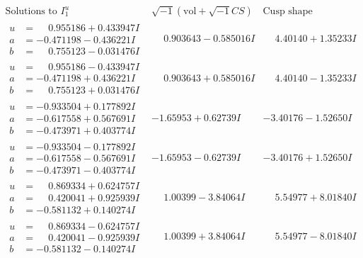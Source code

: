 \documentclass[1p]{elsarticle_modified}
\theoremstyle{definition}
\newcommand{\I}{\sqrt{-1}}
\begin{document}
$$\begin{array}{c|c|c}  
\text{Solutions to }I^u_{1}& \I (\text{vol} + \sqrt{-1}CS) & \text{Cusp shape}\\
 \hline 
\begin{aligned}
u &= \phantom{-}0.955186 + 0.433947 I \\
a &= -0.471198 - 0.436221 I \\
b &= \phantom{-}0.755123 - 0.031476 I\end{aligned}
 & \phantom{-}0.903643 - 0.585016 I & \phantom{-}4.40140 + 1.35233 I \\ \hline\begin{aligned}
u &= \phantom{-}0.955186 - 0.433947 I \\
a &= -0.471198 + 0.436221 I \\
b &= \phantom{-}0.755123 + 0.031476 I\end{aligned}
 & \phantom{-}0.903643 + 0.585016 I & \phantom{-}4.40140 - 1.35233 I \\ \hline\begin{aligned}
u &= -0.933504 + 0.177892 I \\
a &= -0.617558 + 0.567691 I \\
b &= -0.473971 + 0.403774 I\end{aligned}
 & -1.65953 + 0.62739 I & -3.40176 - 1.52650 I \\ \hline\begin{aligned}
u &= -0.933504 - 0.177892 I \\
a &= -0.617558 - 0.567691 I \\
b &= -0.473971 - 0.403774 I\end{aligned}
 & -1.65953 - 0.62739 I & -3.40176 + 1.52650 I \\ \hline\begin{aligned}
u &= \phantom{-}0.869334 + 0.624757 I \\
a &= \phantom{-}0.420041 + 0.925939 I \\
b &= -0.581132 + 0.140274 I\end{aligned}
 & \phantom{-}1.00399 - 3.84064 I & \phantom{-}5.54977 + 8.01840 I \\ \hline\begin{aligned}
u &= \phantom{-}0.869334 - 0.624757 I \\
a &= \phantom{-}0.420041 - 0.925939 I \\
b &= -0.581132 - 0.140274 I\end{aligned}
 & \phantom{-}1.00399 + 3.84064 I & \phantom{-}5.54977 - 8.01840 I \\ \hline\begin{aligned}

\end{aligned}
\end{array}$$
\end{document}

